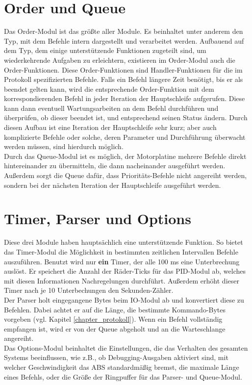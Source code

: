 \section{Order und Queue}
Das Order-Modul ist das größte aller Module. Es beinhaltet unter anderem den Typ, mit dem Befehle
intern dargestellt und verarbeitet werden. Aufbauend auf dem Typ, dem einige unterstützende
Funktionen zugeteilt sind, um wiederkehrende Aufgaben zu erleichtern, existieren im Order-Modul
auch die Order-Funktionen. Diese Order-Funktionen sind Handler-Funktionen für die
im Protokoll spezifizierten Befehle. Falls ein Befehl längere Zeit benötigt, bis er als beendet
gelten kann, wird die entsprechende Order-Funktion mit dem korrespondierenden Befehl in jeder
Iteration der Hauptschleife aufgerufen. Diese kann dann eventuell Wartungsarbeiten an dem
Befehl durchführen und überprüfen, ob dieser beendet ist, und entsprechend seinen Status ändern.
Durch diesen Aufbau ist eine Iteration der Hauptschleife sehr kurz; aber auch komplizierte Befehle
oder solche, deren Parameter und Durchführung überwacht werden müssen, sind hierdurch möglich.\\
Durch das Queue-Modul ist es möglich, der Motorplatine mehrere Befehle direkt hintereinander
zu übermitteln, die dann nacheinander ausgeführt werden. Außerdem sorgt die
Queue dafür, dass Prioritäts-Befehle nicht angereiht werden, sondern bei der nächsten
Iteration der Hauptschleife ausgeführt werden.
\section{Timer, Parser und Options}
Diese drei Module haben hauptsächlich eine unterstützende Funktion. So bietet das Timer-Modul
die Möglichkeit in bestimmten zeitlichen Intervallen Befehle auszuführen. Benutzt wird
nur \textbf{ein} Timer, der alle 100 ms eine Unterbrechung auslöst. Er speichert die Anzahl
der Räder-Ticks für das PID-Modul ab, welches mit diesen Informationen Nachregelungen durchführt.
Außerdem erhöht dieser Timer nach je 10 Unterbechungen den Sekunden-Zähler.\\
Der Parser holt eingegangene Bytes beim IO-Modul ab und konvertiert diese zu Befehlen. Dabei
achtet er auf die Länge, die bestimmte Kommando-Bytes vorgeben (vgl. Kapitel \ref{chapter_protokoll}).
Wenn ein Befehl vollständig empfangen ist, wird er von der Queue abgeholt und an die Warteschlange angereiht.\\
Das Options-Modul beinhaltet die Einstellungen, die das Verhalten des gesamten Systems beeinflussen, wie
z.B., ob Debugging-Ausgaben aktiviert sind, mit welcher Geschwindigkeit das ABS standardmäßig bremst,
die maximale Länge eines Befehls, oder die Größe der Ringpuffer für das Parser- und Queue-Modul.
